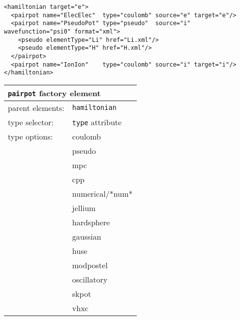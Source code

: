 \begin{lstlisting}[caption=Pseudopotential Hamiltonian XML element.]
<hamiltonian target="e">
  <pairpot name="ElecElec"  type="coulomb" source="e" target="e"/>
  <pairpot name="PseudoPot" type="pseudo"  source="i" wavefunction="psi0" format="xml">
    <pseudo elementType="Li" href="Li.xml"/>
    <pseudo elementType="H" href="H.xml"/>
  </pairpot>
  <pairpot name="IonIon"    type="coulomb" source="i" target="i"/>
</hamiltonian>
\end{lstlisting}


\FloatBarrier
\begin{table}[h]
\begin{center}
\begin{tabularx}{\textwidth}{l l l l l l }
\hline
\multicolumn{6}{l}{\texttt{pairpot} factory element} \\
\hline
\multicolumn{2}{l}{parent elements:} & \multicolumn{4}{l}{\texttt{hamiltonian}}\\
\multicolumn{2}{l}{type   selector:} & \multicolumn{4}{l}{\texttt{type} attribute}\\
\multicolumn{2}{l}{type   options: } & \multicolumn{4}{l}{coulomb}\\
\multicolumn{2}{l}{                } & \multicolumn{4}{l}{pseudo}\\
\multicolumn{2}{l}{                } & \multicolumn{4}{l}{mpc}\\
\multicolumn{2}{l}{                } & \multicolumn{4}{l}{cpp}\\
\multicolumn{2}{l}{                } & \multicolumn{4}{l}{numerical/*num*}\\
\multicolumn{2}{l}{                } & \multicolumn{4}{l}{jellium}\\
\multicolumn{2}{l}{                } & \multicolumn{4}{l}{hardsphere}\\
\multicolumn{2}{l}{                } & \multicolumn{4}{l}{gaussian}\\
\multicolumn{2}{l}{                } & \multicolumn{4}{l}{huse}\\
\multicolumn{2}{l}{                } & \multicolumn{4}{l}{modpostel}\\
\multicolumn{2}{l}{                } & \multicolumn{4}{l}{oscillatory}\\
\multicolumn{2}{l}{                } & \multicolumn{4}{l}{skpot}\\
\multicolumn{2}{l}{                } & \multicolumn{4}{l}{vhxc}\\

\end{tabularx}
\end{center}
\end{table}
